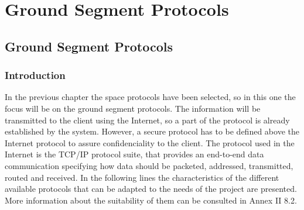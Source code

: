 \chapter{Ground Segment Protocols}

\section{Ground Segment Protocols}
\subsection{Introduction}
In the previous chapter the space protocols have been selected, so in this one the focus will be on the ground segment protocols. The information will be transmitted to the client using the Internet, so a part of the protocol is already established by the system. However, a secure protocol has to be defined above the Internet protocol to assure confidenciality to the client. The protocol used in the Internet is the TCP/IP protocol suite, that provides an end-to-end data communication specifying how data should be packeted, addressed, transmitted, routed and received.
In the following lines the characteristics of the different available protocols that can be adapted to the needs of the project are presented. More information about the suitability of them can be consulted in Annex II 8.2.
